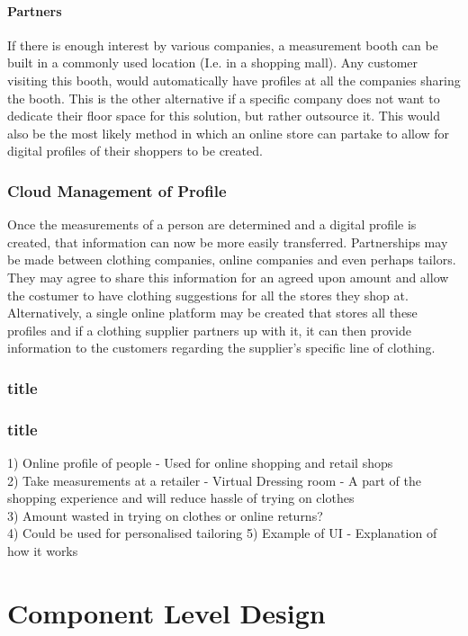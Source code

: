 \paragraph{Partners}
If there is enough interest by various companies, a measurement booth can be built in a commonly used location (I.e. in a shopping mall). Any customer visiting this booth, would automatically have profiles at all the companies sharing the booth. This is the other alternative if a specific company does not want to dedicate their floor space for this solution, but rather outsource it. This would also be the most likely method in which an online store can partake to allow for digital profiles of their shoppers to be created.

\subsubsection{Cloud Management of Profile}
Once the measurements of a person are determined and a digital profile is created, that information can now be more easily transferred. Partnerships may be made between clothing companies, online companies and even perhaps tailors. They may agree to share this information for an agreed upon amount and allow the costumer to have clothing suggestions for all the stores they shop at. Alternatively, a single online platform may be created that stores all these profiles and if a clothing supplier partners up with it, it can then provide information to the customers regarding the supplier's specific line of clothing.

\subsubsection{title}

\subsubsection{title}
1) Online profile of people - Used for online shopping and retail shops\\
2) Take measurements at a retailer - Virtual Dressing room - A part of the shopping experience and will reduce hassle of trying on clothes\\
3) Amount wasted in trying on clothes or online returns?\\
4) Could be used for personalised tailoring
5) Example of UI - Explanation of how it works

\section{Component Level Design}


